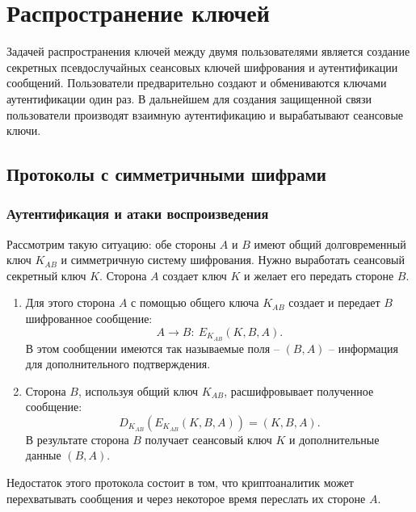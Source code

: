 \documentclass[10pt,a4paper]{book}
\begin{document}








\chapter{Распространение ключей}

Задачей распространения ключей между двумя пользователями является создание секретных псевдослучайных сеансовых ключей шифрования и аутентификации сообщений. Пользователи предварительно создают и обмениваются ключами аутентификации один раз. В дальнейшем для создания защищенной связи пользователи производят взаимную аутентификацию и вырабатывают сеансовые ключи.



\section{Протоколы с симметричными шифрами}

\subsection{Аутентификация и атаки воспроизведения}

Рассмотрим такую ситуацию: обе стороны $A$ и $B$ имеют общий долговременный ключ $K_{AB}$ и симметричную систему шифрования. Нужно выработать сеансовый секретный ключ $K$. Сторона $A$ создает ключ $K$ и желает его передать стороне $B$.

\begin{enumerate}
    \item Для этого сторона $A$ с помощью общего ключа $K_{AB}$ создает и передает $B$ шифрованное сообщение:
            \[ A \rightarrow B: ~ E_{K_{AB}}(K, B, A). \]
        В этом сообщении имеются так называемые поля -- $(B,A)$ -- информация для дополнительного подтверждения.
    \item Сторона $B$, используя общий ключ $K_{AB}$, расшифровывает полученное сообщение:
            \[ D_{K_{AB}}( E_{K_{AB}}( K, B, A)) = (K, B, A). \]
        В результате сторона $B$ получает сеансовый ключ $K$ и дополнительные данные $(B,A)$.
\end{enumerate}

Недостаток этого протокола состоит в том, что криптоаналитик может перехватывать сообщения и через некоторое время переслать их стороне $A$.
\end{document}

